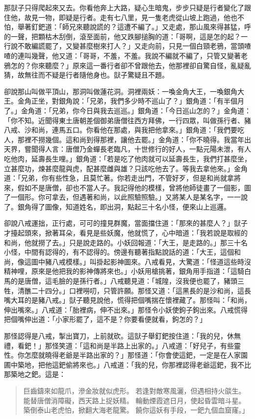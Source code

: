 那獃子只得爬起來又去。你看他奔上大路，疑心生暗鬼，步步只疑是行者變化了跟住他，故見一物，即疑是行者。走有七八里，見一隻老虎從山坡上跑過，他也不怕，舉著釘鈀道：「師兄來聽說謊的？這遭不編了。」又走處，那山風來得甚猛，呼的一聲，把顆枯木刮倒，滾至面前，他又跌腳搥胸的道：「哥啊，這是怎的起？一行說不敢編謊罷了，又變甚麼樹來打人？」又走向前，只見一個白頸老鴉，當頭喳喳的連叫幾聲，他又道：「哥哥，不羞，不羞。我說不編就不編了，只管又變著老鴉怎的？你來聽麼？」原來這一番行者卻不曾跟他去，他那裡卻自驚自怪，亂疑亂猜，故無往而不疑是行者隨他身也。獃子驚疑且不題。

卻說那山叫做平頂山，那洞叫做蓮花洞。洞裡兩妖：一喚金角大王，一喚銀角大王。金角正坐，對銀角說：「兄弟，我們多少時不巡山了？」銀角道：「有半個月了。」金角道：「兄弟，你今日與我去巡巡。」銀角道：「今日巡山怎的？」金角道：「你不知。近聞得東土唐朝差個御弟唐僧往西方拜佛，一行四眾，叫做孫行者、豬八戒、沙和尚，連馬五口。你看他在那處，與我把他拿來。」銀角道：「我們要吃人，那裡不撈幾個。這和尚到得那裡，讓他去罷。」金角道：「你不曉得。我當年出天界，嘗聞得人言：唐僧乃金蟬長老臨凡，十世修行的好人，一點元陽未泄，有人吃他肉，延壽長生哩。」銀角道：「若是吃了他肉就可以延壽長生，我們打甚麼坐，立甚麼功，煉甚麼龍與虎，配甚麼雌與雄？只該吃他去了。等我去拿他來。」金角道：「兄弟，你有些性急，且莫忙著。你若走出門，不管好歹，但是和尚就拿將來，假如不是唐僧，卻也不當人子。我記得他的模樣，曾將他師徒畫了一個影，圖了一個形。你可拿去，但遇著和尚，以此照驗照驗。」又將某人是某名字，一一說了。銀角得了圖像，知道姓名，即出洞，點起三十名小怪，便來山上巡邏。

卻說八戒運拙，正行處，可可的撞見群魔，當面擋住道：「那來的甚麼人？」獃子才擡起頭來，掀著耳朵，看見是些妖魔，他就慌了，心中暗道：「我若說是取經的和尚，他就撈了去。」只是說走路的。小妖回報道：「大王，是走路的。」那三十名小怪，中間有認得的，有不認得的。傍邊有聽著指點說話的道：「大王，這個和尚，像這圖中豬八戒模樣。」叫掛起影神圖來。八戒看見，大驚道：「怪道這些時沒精神哩，原來是他把我的影神傳將來也。」小妖用槍挑著，銀角用手指道：「這騎白馬的是唐僧，這毛臉的是孫行者。」八戒聽見道：「城隍，沒我便也罷了，豬頭三牲，清醮二十四分。」口裡嘮叨，只管許願。那怪又道：「這黑長的是沙和尚，這長嘴大耳的是豬八戒。」獃子聽見說他，慌得把個嘴揣在懷裡藏了。那怪叫：「和尚，伸出嘴來。」八戒道：「胎裡病，伸不出來。」那怪令小妖使鉤子鉤出來。八戒慌得把個嘴伸出道：「小家形罷了，這不是？你要看便就看，鉤怎的？」

那怪認得是八戒，掣出寶刀，上前就砍。這獃子舉釘鈀按住道：「我的兒，休無禮，看鈀！」那怪笑道：「這和尚是半路上出家的。」八戒道：「好兒子，有些靈性。你怎麼就曉得老爺是半路出家的？」那怪道：「你會使這鈀，一定是在人家園圃中築地，把他這鈀偷將來也。」八戒道：「我的兒，你那裡認得老爺這鈀，我不比那築地之鈀。這是：
\begin{quote}
巨齒鑄來如龍爪，滲金妝就似虎形。
若逢對敵寒風灑，但遇相持火燄生。
能替唐僧消障礙，西天路上捉妖精。
輪動煙霞遮日月，使起昏雲暗斗星。
築倒泰山老虎怕，掀翻大海老龍驚。
饒你這妖有手段，一鈀九個血窟窿。」
\end{quote}

